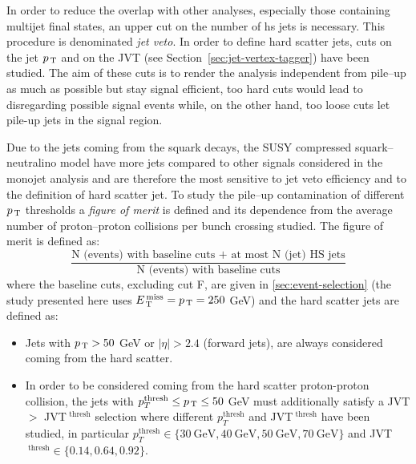 In order to reduce the overlap with other analyses, especially those containing
multijet final states, an upper cut on the number of \gls{hs} jets is
necessary. This procedure is denominated \emph{jet veto}. In order to define
hard scatter jets, cuts on the jet $p_\mathrm{\, T}$ and on the JVT (see
Section~\ref{sec:jet-vertex-tagger}) have been studied. The aim of these cuts is
to render the analysis independent from pile--up as much as possible but stay
signal efficient, too hard cuts would lead to disregarding possible signal
events while, on the other hand, too loose cuts let pile-up jets in the signal
region.

Due to the jets coming from the squark decays, the SUSY compressed
squark--neutralino model have more jets compared to other signals considered in
the monojet analysis and are therefore the most sensitive to jet veto efficiency
and to the definition of hard scatter jet. To study the pile--up contamination
of different $p_\mathrm{\, T}$ thresholds a \emph{figure of merit} is defined and its
dependence from the average number of proton--proton collisions per bunch
crossing studied. The figure of merit is defined as:
\begin{equation}
  \label{eq:fig_merit}
  \frac{\text{N (events) with baseline cuts + at
      most N (jet) HS jets}}{\text{N (events)
      with baseline cuts}}
\end{equation}
where the baseline cuts, excluding cut F, are given in
\cref{sec:event-selection} (the study presented here uses $E_\mathrm{\, T}^\mathrm{\, miss} = p_\mathrm{\, T} = 250$
GeV) and the hard scatter jets are defined as:
\begin{itemize}
\item Jets with $p_\mathrm{\, T} > 50$ GeV or $|\eta| > 2.4$ (forward jets), are always
  considered coming from the hard scatter.
\item In order to be considered coming from the hard scatter proton-proton
  collision, the jets with $p_T^{\text{thresh}} \leq p_\mathrm{\, T} \leq 50$ GeV must
  additionally satisfy a JVT $>$ JVT$^{\text{ thresh}}$ selection where
  different $p_T^{\text{thresh}}$ and JVT$^{\text{ thresh}}$ have been studied,
  in particular
  $p_T^{\text{thresh}} \in \{30~\text{GeV}, 40~\text{GeV}, 50~\text{GeV},
  70~\text{GeV}\}$ and JVT$^{\text{ thresh}} \in \{0.14, 0.64, 0.92\}$.
\end{itemize}

